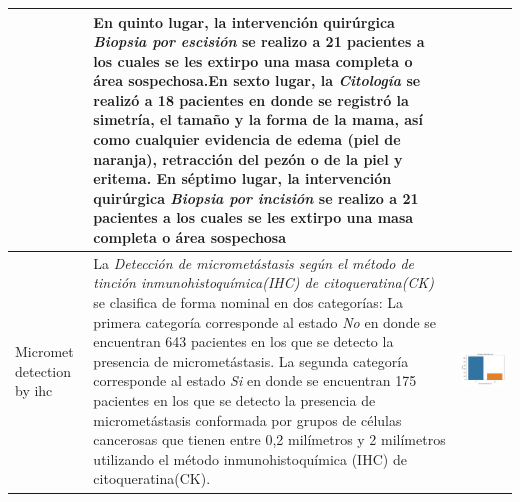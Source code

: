 \begin{table}[!htb]
	\footnotesize
	\begin{threeparttable}
		\begin{tabular}{p{2.5cm} p{7cm} p{6.5cm}} \toprule
			&  En quinto lugar, la intervención quirúrgica \textit{Biopsia por escisión} se realizo a 21 pacientes a los cuales se les extirpo una masa completa o área sospechosa.En sexto lugar, la \textit{Citología} se realizó a 18 pacientes en donde se registró la simetría, el tamaño y la forma de la mama, así como cualquier evidencia de edema (piel de naranja), retracción del pezón o de la piel y eritema. En séptimo lugar, la intervención quirúrgica \textit{Biopsia por incisión} se realizo a 21 pacientes a los cuales se les extirpo una masa completa o área sospechosa
			& 
			\\ \hline
			
			Micromet detection by ihc 
			& La \textit{Detección de micrometástasis según el método de tinción inmunohistoquímica(IHC) de citoqueratina(CK)} se clasifica de forma nominal en dos categorías: La primera categoría corresponde al estado \textit{No} en donde se encuentran 643 pacientes en los que se detecto la presencia de micrometástasis. La segunda categoría corresponde al estado \textit{Si} en donde se encuentran 175  pacientes en los que se detecto la presencia de micrometástasis conformada por grupos de células cancerosas que tienen entre 0,2 milímetros y 2 milímetros  utilizando el método inmunohistoquímica (IHC) de citoqueratina(CK).
			& \begin{center}\includegraphics[width=1\linewidth]{NOTEBOOK/IMAGENES_DESCRIPTIVAS/35_micromet_detection_ihc}\end{center}
			\\ \hline
			

\end{tabular}
\end{threeparttable}
\end{table}
